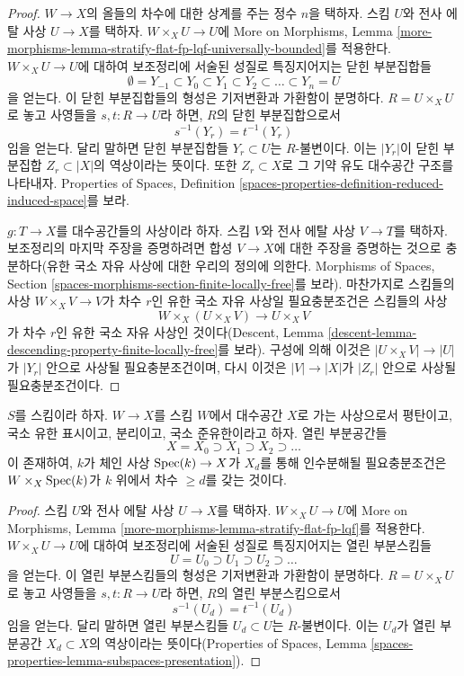\begin{proof}
$W \to X$의 올들의 차수에 대한 상계를 주는 정수 $n$을 택하자.
스킴 $U$와 전사 에탈 사상 $U \to X$를 택하자.
$W \times_X U \to U$에 More on Morphisms, Lemma
\ref{more-morphisms-lemma-stratify-flat-fp-lqf-universally-bounded}를
적용한다. $W \times_X U \to U$에 대하여 보조정리에 서술된 성질로
특징지어지는 닫힌 부분집합들
$$
\emptyset = Y_{-1} \subset Y_0 \subset Y_1 \subset Y_2 \subset
\ldots \subset Y_n = U
$$
을 얻는다. 이 닫힌 부분집합들의 형성은 기저변환과 가환함이 분명하다.
$R = U \times_X U$로 놓고 사영들을 $s, t : R \to U$라 하면,
$R$의 닫힌 부분집합으로서
$$
s^{-1}(Y_r) = t^{-1}(Y_r)
$$
임을 얻는다. 달리 말하면 닫힌 부분집합들 $Y_r \subset U$는
$R$-불변이다. 이는 $|Y_r|$이 닫힌 부분집합
$Z_r \subset |X|$의 역상이라는 뜻이다. 또한 $Z_r \subset X$로
그 기약 유도 대수공간 구조를 나타내자. Properties of Spaces,
Definition \ref{spaces-properties-definition-reduced-induced-space}를
보라.

\medskip\noindent
$g : T \to X$를 대수공간들의 사상이라 하자. 스킴 $V$와 전사 에탈
사상 $V \to T$를 택하자. 보조정리의 마지막 주장을 증명하려면 합성
$V \to X$에 대한 주장을 증명하는 것으로 충분하다(유한 국소 자유
사상에 대한 우리의 정의에 의한다. Morphisms of Spaces, Section
\ref{spaces-morphisms-section-finite-locally-free}를 보라).
마찬가지로 스킴들의 사상 $W \times_X V \to V$가 차수 $r$인 유한
국소 자유 사상일 필요충분조건은 스킴들의 사상
$$
W \times_X (U \times_X V)
\longrightarrow
U \times_X V
$$
가 차수 $r$인 유한 국소 자유 사상인 것이다(Descent, Lemma
\ref{descent-lemma-descending-property-finite-locally-free}를 보라).
구성에 의해 이것은 $|U \times_X V| \to |U|$가 $|Y_r|$ 안으로
사상될 필요충분조건이며, 다시 이것은 $|V| \to |X|$가 $|Z_r|$
안으로 사상될 필요충분조건이다.
\end{proof}

\begin{lemma}
\label{lemma-stratify-flat-fp-lqf}
$S$를 스킴이라 하자. $W \to X$를 스킴 $W$에서 대수공간 $X$로
가는 사상으로서 평탄이고, 국소 유한 표시이고, 분리이고,
국소 준유한이라고 하자. 열린 부분공간들
$$
X = X_0 \supset X_1 \supset X_2 \supset \ldots
$$
이 존재하여, $k$가 체인 사상 $\mathop{\mathrm{Spec}}(k) \to X$가 $X_d$를 통해
인수분해될 필요충분조건은 $W \times_X \mathop{\mathrm{Spec}}(k)$가 $k$ 위에서
차수 $\geq d$를 갖는 것이다.
\end{lemma}

\begin{proof}
스킴 $U$와 전사 에탈 사상 $U \to X$를 택하자.
$W \times_X U \to U$에 More on Morphisms, Lemma
\ref{more-morphisms-lemma-stratify-flat-fp-lqf}를 적용한다.
$W \times_X U \to U$에 대하여 보조정리에 서술된 성질로 특징지어지는
열린 부분스킴들
$$
U = U_0 \supset U_1 \supset U_2 \supset \ldots
$$
을 얻는다.
이 열린 부분스킴들의 형성은 기저변환과 가환함이 분명하다.
$R = U \times_X U$로 놓고 사영들을 $s, t : R \to U$라 하면,
$R$의 열린 부분스킴으로서
$$
s^{-1}(U_d) = t^{-1}(U_d)
$$
임을 얻는다. 달리 말하면 열린 부분스킴들 $U_d \subset U$는
$R$-불변이다. 이는 $U_d$가 열린 부분공간 $X_d \subset X$의
역상이라는 뜻이다(Properties of Spaces, Lemma
\ref{spaces-properties-lemma-subspaces-presentation}).
\end{proof}


